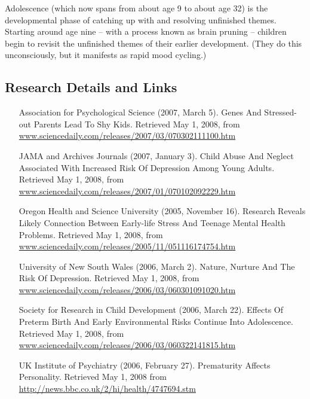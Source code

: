 \documentclass[12pt,DIV9,oneside,headsepline,footsepline]{scrreprt}
\begin{document}
Adolescence (which now spans from about age 9 to about age 32) is the
developmental phase of catching up with and resolving unfinished
themes. Starting around age nine -- with a process known as brain
pruning -- children begin to revisit the unfinished themes of their
earlier development. (They do this unconsciously, but it manifests as
rapid mood cycling.) 

\subsection{Research Details and Links}

\begin{itemize} \item [Association for Psychological Science] (2007,  
March 5). Genes And Stressed-out Parents Lead To Shy Kids. Retrieved
May 1, 2008, from \\ 
\url{www.sciencedaily.com/releases/2007/03/070302111100.htm}

\item [JAMA and Archives Journals] (2007, January 3). Child Abuse And
Neglect Associated With Increased Risk Of Depression Among Young
Adults. Retrieved May 1, 2008, from \\
\url{www.sciencedaily.com/releases/2007/01/070102092229.htm}

\item [Oregon Health and Science University] (2005, November 16).
Research Reveals Likely Connection Between Early-life Stress And
Teenage Mental Health Problems. Retrieved May 1, 2008, from \\ 
\url{www.sciencedaily.com/releases/2005/11/051116174754.htm}

\item [University of New South Wales] (2006, March 2). Nature, Nurture
And The Risk Of Depression. Retrieved May 1, 2008, from \\ 
\url{www.sciencedaily.com/releases/2006/03/060301091020.htm}

\item [Society for Research in Child Development] (2006, March 22).
Effects Of Preterm Birth And Early Environmental Risks Continue Into
Adolescence. Retrieved May 1, 2008, from \\
\url{www.sciencedaily.com/releases/2006/03/060322141815.htm}

\item [UK Institute of Psychiatry] (2006, February 27). Prematurity
Affects Personality. Retrieved May 1, 2008 from \\
\url{http://news.bbc.co.uk/2/hi/health/4747694.stm}

\end{itemize}
\end{document}
